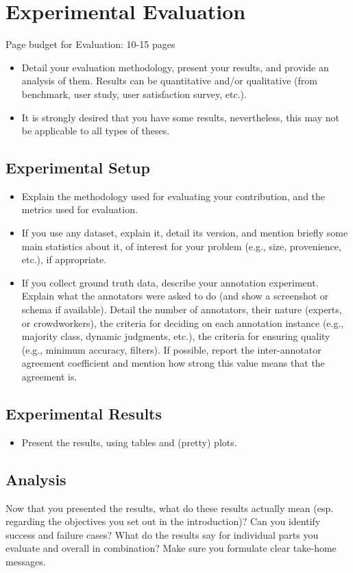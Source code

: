
\chapter{Experimental Evaluation}
\label{ch:eval}
Page budget for Evaluation: 10-15 pages
\begin{itemize}
    \item Detail your evaluation methodology, present your results, and provide an analysis of them. Results can be quantitative and/or qualitative (from benchmark, user study, user satisfaction survey, etc.).
    \item It is strongly desired that you have some results, nevertheless, this may not be applicable to all types of theses.
\end{itemize}

\section{Experimental Setup}
\begin{itemize}
    \item Explain the methodology used for evaluating your contribution, and the metrics used for evaluation.
    \item If you use any dataset, explain it, detail its version, and mention briefly some main statistics about it, of interest for your problem (e.g., size, provenience, etc.), if appropriate.
    \item If you collect ground truth data, describe your annotation experiment. Explain what the annotators were asked to do (and show a screenshot or schema if available). Detail the number of annotators, their nature (experts, or crowdworkers), the criteria for deciding on each annotation instance (e.g., majority class, dynamic judgments, etc.), the criteria for ensuring quality (e.g., minimum accuracy, filters). If possible, report the inter-annotator agreement coefficient and mention how strong this value means that the agreement is.
\end{itemize}

\section{Experimental Results}
\begin{itemize}
    \item Present the results, using tables and (pretty) plots.
\end{itemize}

\section{Analysis}
Now that you presented the results, what do these results actually mean (esp. regarding the objectives you set out in the introduction)? Can you identify success and failure cases? What do the results say for individual parts you evaluate and overall in combination? Make sure you formulate clear take-home messages.

